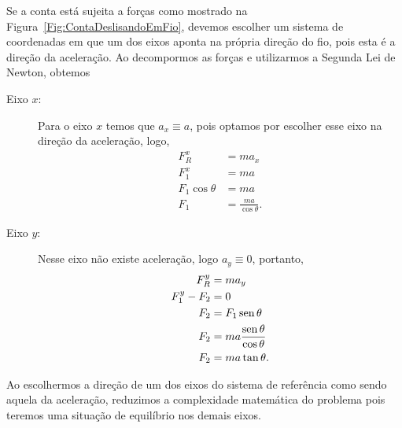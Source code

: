 Se a conta está sujeita a forças como mostrado na Figura~\ref{Fig:ContaDeslisandoEmFio}, devemos escolher um sistema de coordenadas em que um dos eixos aponta na própria direção do fio, pois esta é a direção da aceleração. Ao decompormos as forças e utilizarmos a Segunda Lei de Newton, obtemos
\begin{description}
\item[Eixo $x$:] Para o eixo $x$ temos que $a_x \equiv a$, pois optamos por escolher esse eixo na direção da aceleração, logo,
\begin{align}
    F_R^x &= m a_x \\
    F_1^x &= m a \\
    F_1 \cos\theta &= m a \\
    F_1 &= \frac{ma}{\cos\theta}.
\end{align}

\item[Eixo $y$:] Nesse eixo não existe aceleração, logo $a_y \equiv 0$, portanto,
\begin{align}
    F_R^y &= m a_y \\
    F_1^y - F_2 &= 0 \\
    F_2 &= F_1 \operatorname{sen}\theta \\
    F_2 &= ma \frac{\operatorname{sen}\theta}{\cos\theta} \\
    F_2 &= ma\tan\theta.
\end{align}
\end{description}

\begin{marginfigure}
\centering
{}
\caption{Ao escolhermos a direção de um dos eixos do sistema de referência como sendo aquela da aceleração, reduzimos a complexidade matemática do problema pois teremos uma situação de equilíbrio nos demais eixos.\label{Fig:ContaDeslisandoEmFioRef}}
\end{marginfigure}

